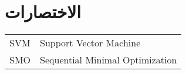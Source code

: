 

\chapter*{الاختصارات}

\begin{doublespacing}
	\begin{center}
		\begin{english}
			\begin{tabular}{l l}
				SVM		&		Support Vector Machine \\
				SMO		&		Sequential Minimal Optimization \\
			\end{tabular}
		\end{english}
	\end{center}
\end{doublespacing}

